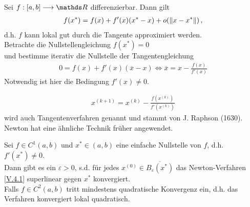  
Sei $f:[a,b]\longrightarrow \R$ differenzierbar. Dann gilt
\begin{gather*}
f(x^{*}) = f(x) + f'(x)(x^{*}-x)+o(\left\| x-x^{*} \right\|) \, ,
\end{gather*} 
d.h. $f$ kann lokal gut durch die Tangente approximiert werden. \\
Betrachte die Nullstellengleichung $f(x^{*}) = 0$ \\
\label{im5.4}
und bestimme iterativ die Nullstelle der Tangentengleichung
\begin{gather*}
0=f(x) + f'(x)(\overline{x}-x) \Leftrightarrow \overline{x}= x-\frac{f(x)}{f'(x)}
\end{gather*}
Notwendig ist hier die Bedingung $f'(x) \neq 0$.


\begin{gather}
x^{(k+1)} = x^{(k)} - \frac{f(x^{(k)})}{f'(x^{(k)})}
\label{V.4.1}
\end{gather}
wird auch Tangentenverfahren genannt und stammt von
J. Raphson (1630). Newton hat eine ähnliche Technik früher angewendet.

\begin{Satze}
	\label{5.4.2}
	Sei $f\in C^1(a,b)$ und $x^{*}\in (a,b)$ eine einfache Nullstelle von $f$, d.h. $f'(x^{*})\neq 0$. \\
	Dann gibt es ein  $\varepsilon >0$, s.d. für jedes $x^{(0)}\in\overline{B_\varepsilon(x^{*})}$
	das Newton-Verfahren \eqref{V.4.1} superlinear gegen $x^{*}$ konvergiert.\\
	Falls $f\in C^2(a,b) $ tritt mindestens quadratische Konvergenz ein, d.h. das Verfahren
	konvergiert lokal quadratisch.
\end{Satze}

